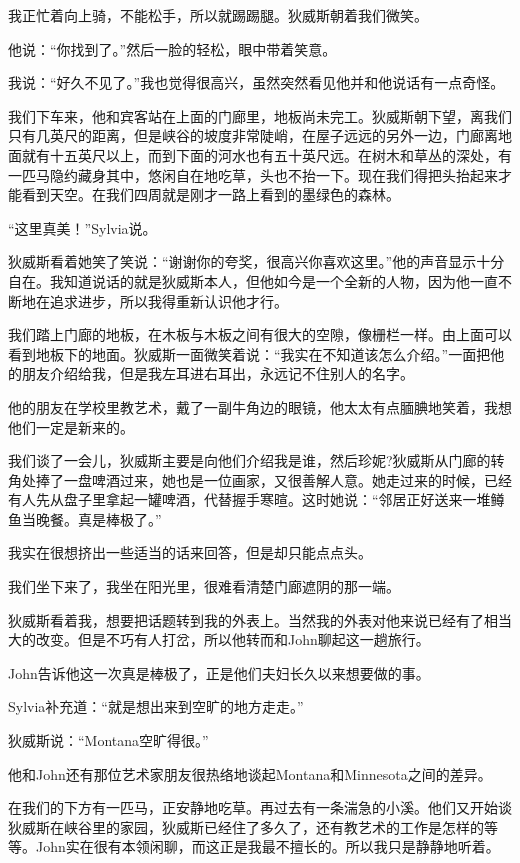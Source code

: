 \documentclass[UTF8]{article}
\begin{document}
\par 我正忙着向上骑，不能松手，所以就踢踢腿。狄威斯朝着我们微笑。
\par 他说：“你找到了。”然后一脸的轻松，眼中带着笑意。
\par 我说：“好久不见了。”我也觉得很高兴，虽然突然看见他并和他说话有一点奇怪。
\par 我们下车来，他和宾客站在上面的门廊里，地板尚未完工。狄威斯朝下望，离我们只有几英尺的距离，但是峡谷的坡度非常陡峭，在屋子远远的另外一边，门廊离地面就有十五英尺以上，而到下面的河水也有五十英尺远。在树木和草丛的深处，有一匹马隐约藏身其中，悠闲自在地吃草，头也不抬一下。现在我们得把头抬起来才能看到天空。在我们四周就是刚才一路上看到的墨绿色的森林。
\par “这里真美！”Sylvia说。
\par 狄威斯看着她笑了笑说：“谢谢你的夸奖，很高兴你喜欢这里。”他的声音显示十分自在。我知道说话的就是狄威斯本人，但他如今是一个全新的人物，因为他一直不断地在追求进步，所以我得重新认识他才行。
\par 我们踏上门廊的地板，在木板与木板之间有很大的空隙，像栅栏一样。由上面可以看到地板下的地面。狄威斯一面微笑着说：“我实在不知道该怎么介绍。”一面把他的朋友介绍给我，但是我左耳进右耳出，永远记不住别人的名字。
\par 他的朋友在学校里教艺术，戴了一副牛角边的眼镜，他太太有点腼腆地笑着，我想他们一定是新来的。
\par 我们谈了一会儿，狄威斯主要是向他们介绍我是谁，然后珍妮?狄威斯从门廊的转角处捧了一盘啤酒过来，她也是一位画家，又很善解人意。她走过来的时候，已经有人先从盘子里拿起一罐啤酒，代替握手寒暄。这时她说：“邻居正好送来一堆鳟鱼当晚餐。真是棒极了。”
\par 我实在很想挤出一些适当的话来回答，但是却只能点点头。
\par 我们坐下来了，我坐在阳光里，很难看清楚门廊遮阴的那一端。
\par 狄威斯看着我，想要把话题转到我的外表上。当然我的外表对他来说已经有了相当大的改变。但是不巧有人打岔，所以他转而和John聊起这一趟旅行。
\par John告诉他这一次真是棒极了，正是他们夫妇长久以来想要做的事。
\par Sylvia补充道：“就是想出来到空旷的地方走走。”
\par 狄威斯说：“Montana空旷得很。”
\par 他和John还有那位艺术家朋友很热络地谈起Montana和Minnesota之间的差异。
\par 在我们的下方有一匹马，正安静地吃草。再过去有一条湍急的小溪。他们又开始谈狄威斯在峡谷里的家园，狄威斯已经住了多久了，还有教艺术的工作是怎样的等等。John实在很有本领闲聊，而这正是我最不擅长的。所以我只是静静地听着。
\end{document}
